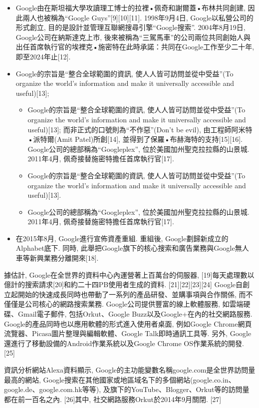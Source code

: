 \begin{itemize}
\item Google由在斯坦福大學攻讀理工博士的拉裡•佩奇和謝爾蓋•布林共同創建, 因此兩人也被稱為``Google Guys''[9][10][11]. 1998年9月4日, Google以私營公司的形式創立, 目的是設計並管理互聯網搜尋引擎``Google搜索''. 2004年8月19日, Google公司在納斯達克上市, 後來被稱為``三駕馬車''的公司兩位共同創始人與出任首席執行官的埃裡克•施密特在此時承諾：共同在Google工作至少二十年, 即至2024年止[12].

\item Google的宗旨是``整合全球範圍的資訊, 使人人皆可訪問並從中受益''(To organize the world's information and make it universally accessible and useful)[13];
\begin{itemize}
\item Google的宗旨是``整合全球範圍的資訊, 使人人皆可訪問並從中受益''(To organize the world's information and make it universally accessible and useful)[13]; 而非正式的口號則為``不作惡''(Don't be evil), 由工程師阿米特•派特爾(Amit Patel)所創[14], 並得到了保羅•布赫海特的支持[15][16]. Google公司的總部稱為``Googleplex'', 位於美國加州聖克拉拉縣的山景城. 2011年4月, 佩奇接替施密特擔任首席執行官[17].
\item Google的宗旨是``整合全球範圍的資訊, 使人人皆可訪問並從中受益''(To organize the world's information and make it universally accessible and useful)[13].
\item Google公司的總部稱為``Googleplex'', 位於美國加州聖克拉拉縣的山景城. 2011年4月, 佩奇接替施密特擔任首席執行官[17].
\end{itemize}

\item 在2015年8月, Google進行宣佈資產重組. 重組後, Google劃歸新成立的Alphabet底下. 同時, 此舉把Google旗下的核心搜索和廣告業務與Google無人車等新興業務分離開來[18].
\end{itemize}

據估計, Google在全世界的資料中心內運營著上百萬台的伺服器, [19]每天處理數以億計的搜索請求[20]和約二十四PB使用者生成的資料. [21][22][23][24] Google自創立起開始的快速成長同時也帶動了一系列的產品研發、並購事項與合作關係, 而不僅僅是公司核心的網路搜索業務. Google公司提供豐富的線上軟體服務, 如雲端硬碟、Gmail電子郵件, 包括Orkut、Google Buzz以及Google+在內的社交網路服務. Google的產品同時也以應用軟體的形式進入使用者桌面, 例如Google Chrome網頁流覽器、Picasa圖片整理與編輯軟體、Google Talk即時通訊工具等. 另外, Google還進行了移動設備的Android作業系統以及Google Chrome OS作業系統的開發. [25]

資訊分析網站Alexa資料顯示, Google的主功能變數名稱google.com是全世界訪問量最高的網站, Google搜索在其他國家或地區域名下的多個網站(google.co.in、google.de、google.com.hk等等), 及旗下的YouTube、Blogger、Orkut等的訪問量都在前一百名之內. [26]其中, 社交網路服務Orkut於2014年9月關閉. [27]

